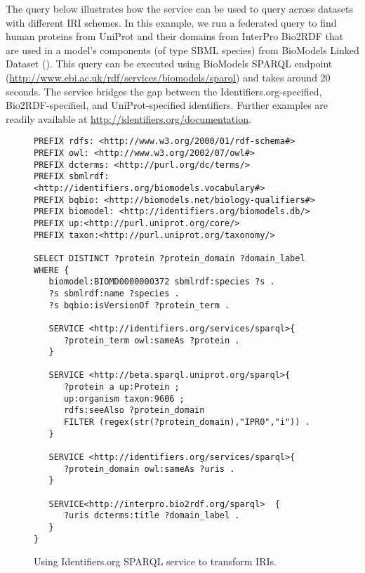 \documentclass{bioinfo}
\begin{document}
The query below illustrates how the service can be used to query across datasets with different IRI schemes. In this example, we run a federated query to find human proteins from UniProt and their domains from InterPro Bio2RDF that are used in a model's components (of type SBML species) from BioModels Linked Dataset (\cite{Wimalaratne2014}). This query can be executed using BioModels SPARQL endpoint 
(\href{http://www.ebi.ac.uk/rdf/services/biomodels/sparql}{http://www.ebi.ac.uk/rdf/services/biomodels/sparql}) and takes around 20 seconds. The service bridges the gap between the Identifiers.org-specified, Bio2RDF-specified, and UniProt-specified identifiers. Further examples are readily available at \href{http://identifiers.org/documentation}{http://identifiers.org/documentation}.

\begin{figure}[h]
{\fontsize{6.5pt}{1em}
\begin{verbatim}
PREFIX rdfs: <http://www.w3.org/2000/01/rdf-schema#>
PREFIX owl: <http://www.w3.org/2002/07/owl#>
PREFIX dcterms: <http://purl.org/dc/terms/>
PREFIX sbmlrdf: <http://identifiers.org/biomodels.vocabulary#>
PREFIX bqbio: <http://biomodels.net/biology-qualifiers#>
PREFIX biomodel: <http://identifiers.org/biomodels.db/>
PREFIX up:<http://purl.uniprot.org/core/> 
PREFIX taxon:<http://purl.uniprot.org/taxonomy/> 

SELECT DISTINCT ?protein ?protein_domain ?domain_label WHERE {
   biomodel:BIOMD0000000372 sbmlrdf:species ?s . 
   ?s sbmlrdf:name ?species .
   ?s bqbio:isVersionOf ?protein_term .

   SERVICE <http://identifiers.org/services/sparql>{
      ?protein_term owl:sameAs ?protein .
   }

   SERVICE <http://beta.sparql.uniprot.org/sparql>{
      ?protein a up:Protein ; 
      up:organism taxon:9606 ;
      rdfs:seeAlso ?protein_domain 
      FILTER (regex(str(?protein_domain),"IPR0","i")) .
   }

   SERVICE <http://identifiers.org/services/sparql>{
      ?protein_domain owl:sameAs ?uris .
   }

   SERVICE<http://interpro.bio2rdf.org/sparql>  {
      ?uris dcterms:title ?domain_label .
   }      
}
\end{verbatim}
}
\caption{Using Identifiers.org SPARQL service to transform IRIs.}
\label{example1}
\end{figure}
   
\end{document}
